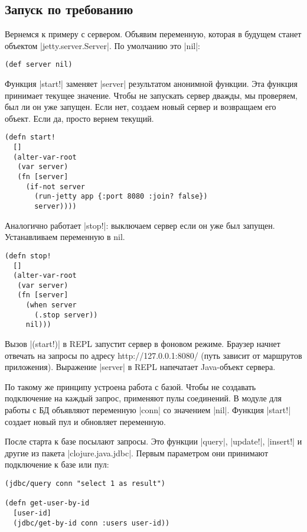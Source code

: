 \subsection{Запуск по требованию}

Вернемся к примеру с сервером. Объявим переменную, которая в будущем станет
объектом \spverb|jetty.server.Server|. По умолчанию это \spverb|nil|:

\begin{verbatim}
(def server nil)
\end{verbatim}

Функция \spverb|start!| заменяет \spverb|server| результатом анонимной функции. Эта функция
принимает текущее значение. Чтобы не запускать сервер дважды, мы проверяем, был
ли он уже запущен. Если нет, создаем новый сервер и возвращаем его объект. Если
да, просто вернем текущий.

\begin{verbatim}
(defn start!
  []
  (alter-var-root
   (var server)
   (fn [server]
     (if-not server
       (run-jetty app {:port 8080 :join? false})
       server))))
\end{verbatim}

Аналогично работает \spverb|stop!|: выключаем сервер если он уже был
запущен. Устанавливаем переменную в nil.

\begin{verbatim}
(defn stop!
  []
  (alter-var-root
   (var server)
   (fn [server]
     (when server
       (.stop server))
     nil)))
\end{verbatim}

Вызов \spverb|(start!)| в REPL запустит сервер в фоновом режиме. Браузер начнет
отвечать на запросы по адресу http://127.0.0.1:8080/ (путь зависит от маршрутов
приложения). Выражение \spverb|server| в REPL напечатает Java-объект сервера.

По такому же принципу устроена работа с базой. Чтобы не создавать подключение на
каждый запрос, применяют пулы соединений. В модуле для работы с БД объявляют
переменную \spverb|conn| со значением \spverb|nil|. Функция \spverb|start!| создает новый пул и
обновляет переменную.

После старта к базе посылают запросы. Это функции \spverb|query|, \spverb|update!|, \spverb|insert!|
и другие из пакета \spverb|clojure.java.jdbc|. Первым параметром они принимают
подключение к базе или пул:

\begin{verbatim}
(jdbc/query conn "select 1 as result")

(defn get-user-by-id
  [user-id]
  (jdbc/get-by-id conn :users user-id))
\end{verbatim}

